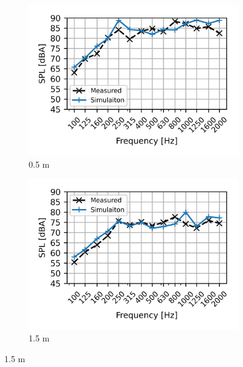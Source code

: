 \begin{figure}[H]
	\centering
	\begin{subfigure}[b]{0.49\textwidth}
		\centering
		\includegraphics{fig/chap5/initial_model/freq_spectrum/pos_10cm_0pt5m.png}
		\caption{0.5 m}
	\end{subfigure}
	\begin{subfigure}[b]{0.49\textwidth}
		\centering
		\includegraphics{fig/chap5/initial_model/freq_spectrum/pos_10cm_1pt5m.png}
		\caption{1.5 m}
	\end{subfigure}
\end{figure}
